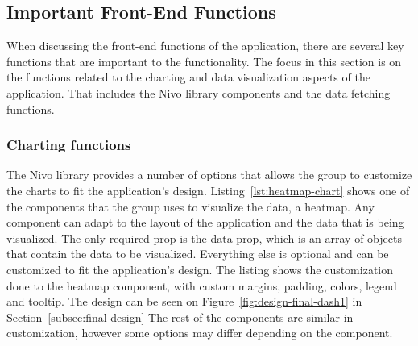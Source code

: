 \subsection{Important Front-End Functions}\label{subsec:important-front-end-functions}

When discussing the front-end functions of the application, there are several key functions that are important to the
functionality.
The focus in this section is on the functions related to the charting and data visualization aspects of the application.
That includes the Nivo library components and the data fetching functions.

\subsubsection{Charting functions}\label{subsubsec:charting-functions}

The Nivo library provides a number of options that allows the group to customize the charts to fit the application's
design.
Listing~\ref{lst:heatmap-chart} shows one of the components that the group uses to visualize the data, a heatmap.
Any component can adapt to the layout of the application and the data that is being visualized.
The only required prop is the data prop, which is an array of objects that contain the data to be visualized.
Everything else is optional and can be customized to fit the application's design.
The listing shows the customization done to the heatmap component, with custom margins, padding, colors, legend and
tooltip.
The design can be seen on Figure~\ref{fig:design-final-dash1} in Section~\ref{subsec:final-design}
The rest of the components are similar in customization, however some options may differ depending on the component.

